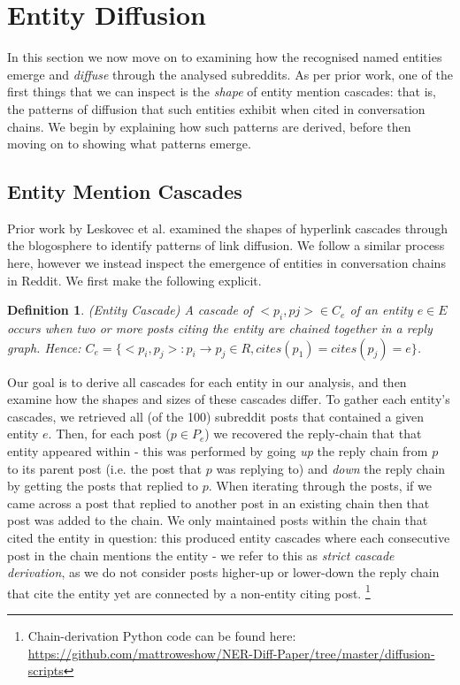 \documentclass[review]{elsarticle}
\newtheorem{mydef}{Definition}
\begin{document}
\section{Entity Diffusion}
\label{sec:diffusion}
In this section we now move on to examining how the recognised named entities emerge and \emph{diffuse} through the analysed subreddits.
As per prior work, one of the first things that we can inspect is the \emph{shape} of entity mention cascades: that is, the patterns of diffusion that such entities exhibit when cited in conversation chains. 
We begin by explaining how such patterns are derived, before then moving on to showing what patterns emerge.

\subsection{Entity Mention Cascades}
Prior work by Leskovec et al. \cite{leskovec2007patterns} examined the shapes of hyperlink cascades through the blogosphere to identify patterns of link diffusion.
We follow a similar process here, however we instead inspect the emergence of entities in conversation chains in Reddit.
We first make the following explicit.

\begin{mydef}
(Entity Cascade) A cascade of ${<p_i, pj>} \in C_e$ of an entity $e \in E$ occurs when two or more posts citing the entity are chained together in a reply graph. 
Hence: $C_e = \{<p_i, p_j> : p_i \rightarrow p_j \in R, cites(p_1) = cites(p_j) = e\}$.
\end{mydef}

Our goal is to derive all cascades for each entity in our analysis, and then examine how the shapes and sizes of these cascades differ.
To gather each entity's cascades, we retrieved all (of the 100) subreddit posts that contained a given entity $e$.
Then, for each post ($p \in P_e$) we recovered the reply-chain that that entity appeared within - this was performed by going \emph{up} the reply chain from $p$ to its parent post (i.e. the post that $p$ was replying to) and \emph{down} the reply chain by getting the posts that replied to $p$.
When iterating through the posts, if we came across a post that replied to another post in an existing chain then that post was added to the chain.
We only maintained posts within the chain that cited the entity in question: this produced entity cascades where each consecutive post in the chain mentions the entity - we refer to this as \emph{strict cascade derivation}, as we do not consider posts higher-up or lower-down the reply chain that cite the entity yet are connected by a non-entity citing post. \footnote{Chain-derivation Python code can be found here: \url{https://github.com/mattroweshow/NER-Diff-Paper/tree/master/diffusion-scripts}}
\end{document}
